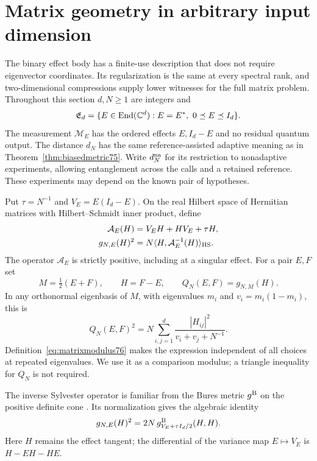 \section{Matrix geometry in arbitrary input dimension}
\label{sec:matrixmetric76}

The binary effect body has a finite-use description that does not
require eigenvector coordinates.  Its regularization is the same at
every spectral rank, and two-dimensional compressions supply lower
witnesses for the full matrix problem.  Throughout this section
$d,N\ge1$ are integers and
\begin{equation}\label{eq:matrixbody76}
 \mathfrak E_d=\{E\in\operatorname{End}(\mathbb C^d):E=E^*,\ 0\preceq E\preceq I_d\}.
\end{equation}
The measurement $\mathcal M_E$ has the ordered effects $E,I_d-E$
and no residual quantum output.  The distance $d_N$ has the same
reference-assisted adaptive meaning as in
Theorem~\ref{thm:biasedmetric75}.  Write $d_N^{\rm na}$ for its
restriction to nonadaptive experiments, allowing entanglement across
the calls and a retained reference.  These experiments may depend on
the known pair of hypotheses.

Put $\tau=N^{-1}$ and $V_E=E(I_d-E)$.  On the real Hilbert space
of Hermitian matrices with Hilbert--Schmidt inner product, define
\begin{align}
 \mathcal A_E(H)&=V_EH+HV_E+\tau H,
                                      \label{eq:matrixoperator76}\\
 g_{N,E}(H)^2&=N\langle H,\mathcal A_E^{-1}(H)\rangle_{\rm HS}.
                                      \label{eq:matrixform76}
\end{align}
The operator $\mathcal A_E$ is strictly positive, including at a
singular effect.  For a pair $E,F$ set
\begin{equation}\label{eq:matrixmodulus76}
 M=\tfrac12(E+F),\qquad H=F-E,\qquad
 Q_N(E,F)=g_{N,M}(H).
\end{equation}
In any orthonormal eigenbasis of $M$, with eigenvalues $m_i$ and
$v_i=m_i(1-m_i)$, this is
\begin{equation}\label{eq:matrixcoordinates76}
 Q_N(E,F)^2=N\sum_{i,j=1}^d
                \frac{|H_{ij}|^2}{v_i+v_j+N^{-1}}.
\end{equation}
Definition~\eqref{eq:matrixmodulus76} makes the expression independent
of all choices at repeated eigenvalues.  We use it as a comparison
modulus; a triangle inequality for $Q_N$ is not required.

The inverse Sylvester operator is familiar from the Bures metric
$g^{\rm B}$ on the positive definite cone \cite{Dittmann76}.
Its normalization gives the algebraic identity
\[
 g_{N,E}(H)^2=2N\,g^{\rm B}_{V_E+\tau I_d/2}(H,H).
\]
Here $H$ remains the effect tangent; the differential of the
variance map $E\mapsto V_E$ is $H-EH-HE$.

